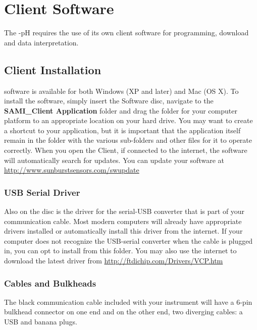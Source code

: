 \section{\instType{} Client Software}
\label{sec:Software}

The \instType{}-pH requires the use of its own client software for programming, download and data interpretation.


\subsection{\instType{} Client Installation}
\label{sec:Install}

\instType{} software is available for both Windows (XP and later) and Mac (OS X).  To install the software, simply insert the \instType{} Software disc, navigate to the \textbf{SAMI\_Client Application} folder and drag the folder for your computer platform to an appropriate location on your hard drive.  You may want to create a shortcut to your application, but it is important that the application itself remain in the folder with the various sub-folders and other files for it to operate correctly.  When you open the \instType{} Client, if connected to the internet, the software will automatically search for updates.  You can update your software at \url{http://www.sunburstsensors.com/swupdate}


\subsubsection{USB Serial Driver}

Also on the disc is the driver for the serial-USB converter that is part of your communication cable. Most modern computers will already have appropriate drivers installed or automatically install this driver from the internet.  If your computer does not recognize the USB-serial converter when the cable is plugged in, you can opt to install from this folder.  You may also use the internet to download the latest driver from \url{http://ftdichip.com/Drivers/VCP.htm}


\subsubsection{\instType{} Cables and Bulkheads}
\label{Cable}

\ifcase \inst	%

The black communication cable included with your instrument will have a 6-pin bulkhead connector on one end and on the other end, two diverging cables: a USB and banana plugs. 

